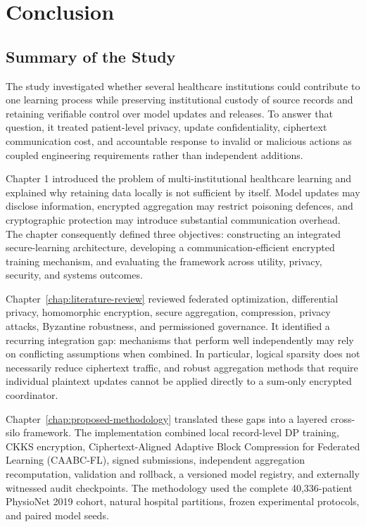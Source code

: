 \chapter{Conclusion}
\label{chap:conclusion}

\section{Summary of the Study}
\label{sec:conclusion-summary}

The study investigated whether several healthcare institutions could contribute to one learning process while preserving institutional custody of source records and retaining verifiable control over model updates and releases. To answer that question, it treated patient-level privacy, update confidentiality, ciphertext communication cost, and accountable response to invalid or malicious actions as coupled engineering requirements rather than independent additions.

Chapter 1 introduced the problem of multi-institutional healthcare learning and explained why retaining data locally is not sufficient by itself. Model updates may disclose information, encrypted aggregation may restrict poisoning defences, and cryptographic protection may introduce substantial communication overhead. The chapter consequently defined three objectives: constructing an integrated secure-learning architecture, developing a communication-efficient encrypted training mechanism, and evaluating the framework across utility, privacy, security, and systems outcomes.

Chapter~\ref{chap:literature-review} reviewed federated optimization, differential privacy, homomorphic encryption, secure aggregation, compression, privacy attacks, Byzantine robustness, and permissioned governance. It identified a recurring integration gap: mechanisms that perform well independently may rely on conflicting assumptions when combined. In particular, logical sparsity does not necessarily reduce ciphertext traffic, and robust aggregation methods that require individual plaintext updates cannot be applied directly to a sum-only encrypted coordinator.

Chapter~\ref{chap:proposed-methodology} translated these gaps into a layered cross-silo framework. The implementation combined local record-level DP training, CKKS encryption, Ciphertext-Aligned Adaptive Block Compression for Federated Learning (CAABC-FL), signed submissions, independent aggregation recomputation, validation and rollback, a versioned model registry, and externally witnessed audit checkpoints. The methodology used the complete 40,336-patient PhysioNet 2019 cohort, natural hospital partitions, frozen experimental protocols, and paired model seeds.

